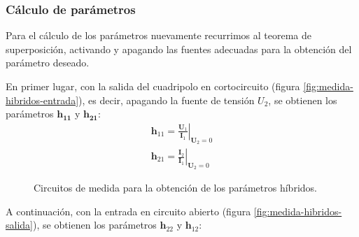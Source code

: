 \subsubsection{Cálculo de parámetros}

Para el cálculo de los parámetros nuevamente recurrimos al teorema de superposición, activando y apagando las fuentes adecuadas para la obtención del parámetro deseado.

En primer lugar, con la salida del cuadripolo en cortocircuito (figura \ref{fig:medida-hibridos-entrada}), es decir, apagando la fuente de tensión $U_2$, se obtienen los parámetros $\mathbf{h_{11}}$ y $\mathbf{h_{21}}$:
    \[
      \begin{array}{c}
        \mathbf{h}_{11} = \left.\frac{\mathbf{U}_1}{\mathbf{I}_1}\right\rvert_{\mathbf{U}_2 = 0} \\
        \mathbf{h}_{21} = \left.\frac{\mathbf{I}_2}{\mathbf{I}_1}\right\rvert_{\mathbf{U}_2 = 0}
      \end{array}
    \]

\begin{figure}[H]
  \centering
  \hspace{2cm}
\caption{Circuitos de medida para la obtención de los parámetros híbridos.}
  \label{fig:medida-hibridos}
\end{figure}


A continuación, con la entrada en circuito abierto (figura \ref{fig:medida-hibridos-salida}), se obtienen los parámetros $\mathbf{h}_{22}$ y $\mathbf{h}_{12}$:

